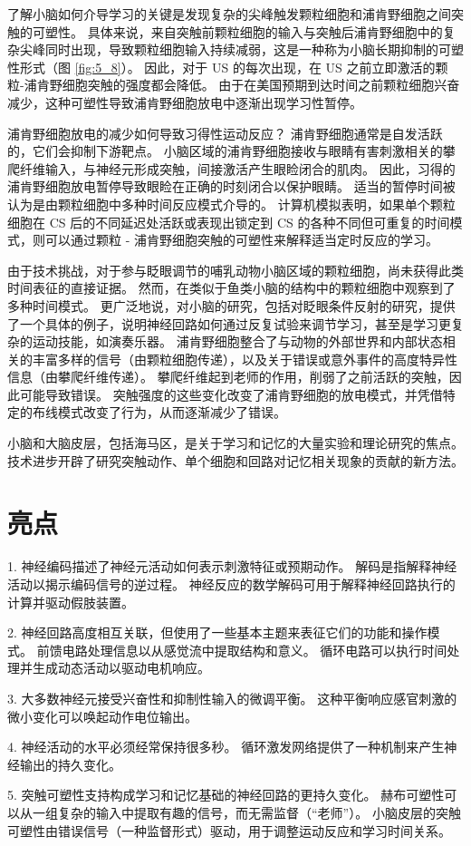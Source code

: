 了解小脑如何介导学习的关键是发现复杂的尖峰触发颗粒细胞和浦肯野细胞之间突触的可塑性。 
具体来说，来自突触前颗粒细胞的输入与突触后浦肯野细胞中的复杂尖峰同时出现，导致颗粒细胞输入持续减弱，这是一种称为小脑长期抑制的可塑性形式（图 \ref{fig:5_8}）。 
因此，对于 US 的每次出现，在 US 之前立即激活的颗粒-浦肯野细胞突触的强度都会降低。 
由于在美国预期到达时间之前颗粒细胞兴奋减少，这种可塑性导致浦肯野细胞放电中逐渐出现学习性暂停。


浦肯野细胞放电的减少如何导致习得性运动反应？ 
浦肯野细胞通常是自发活跃的，它们会抑制下游靶点。 
小脑区域的浦肯野细胞接收与眼睛有害刺激相关的攀爬纤维输入，与神经元形成突触，间接激活产生眼睑闭合的肌肉。 
因此，习得的浦肯野细胞放电暂停导致眼睑在正确的时刻闭合以保护眼睛。 
适当的暂停时间被认为是由颗粒细胞中多种时间反应模式介导的。 
计算机模拟表明，如果单个颗粒细胞在 CS 后的不同延迟处活跃或表现出锁定到 CS 的各种不同但可重复的时间模式，则可以通过颗粒 - 浦肯野细胞突触的可塑性来解释适当定时反应的学习。


由于技术挑战，对于参与眨眼调节的哺乳动物小脑区域的颗粒细胞，尚未获得此类时间表征的直接证据。 
然而，在类似于鱼类小脑的结构中的颗粒细胞中观察到了多种时间模式。 
更广泛地说，对小脑的研究，包括对眨眼条件反射的研究，提供了一个具体的例子，说明神经回路如何通过反复试验来调节学习，甚至是学习更复杂的运动技能，如演奏乐器。 
浦肯野细胞整合了与动物的外部世界和内部状态相关的丰富多样的信号（由颗粒细胞传递），以及关于错误或意外事件的高度特异性信息（由攀爬纤维传递）。 
攀爬纤维起到老师的作用，削弱了之前活跃的突触，因此可能导致错误。 
突触强度的这些变化改变了浦肯野细胞的放电模式，并凭借特定的布线模式改变了行为，从而逐渐减少了错误。


小脑和大脑皮层，包括海马区，是关于学习和记忆的大量实验和理论研究的焦点。 
技术进步开辟了研究突触动作、单个细胞和回路对记忆相关现象的贡献的新方法。


\section{亮点}
1. 神经编码描述了神经元活动如何表示刺激特征或预期动作。 
解码是指解释神经活动以揭示编码信号的逆过程。 
神经反应的数学解码可用于解释神经回路执行的计算并驱动假肢装置。 


2. 神经回路高度相互关联，但使用了一些基本主题来表征它们的功能和操作模式。 
前馈电路处理信息以从感觉流中提取结构和意义。 
循环电路可以执行时间处理并生成动态活动以驱动电机响应。 


3. 大多数神经元接受兴奋性和抑制性输入的微调平衡。 
这种平衡响应感官刺激的微小变化可以唤起动作电位输出。 


4. 神经活动的水平必须经常保持很多秒。 
循环激发网络提供了一种机制来产生神经输出的持久变化。 


5. 突触可塑性支持构成学习和记忆基础的神经回路的更持久变化。 
赫布可塑性可以从一组复杂的输入中提取有趣的信号，而无需监督（“老师”）。 
小脑皮层的突触可塑性由错误信号（一种监督形式）驱动，用于调整运动反应和学习时间关系。



